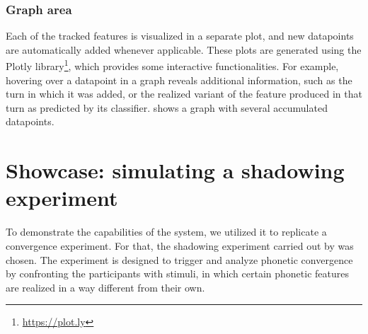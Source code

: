 \subsubsection{Graph area}
\label{subsubsec:graph_area}

Each of the tracked features is visualized in a separate plot, and new datapoints are automatically added whenever applicable.
These plots are generated using the Plotly library\footnote{\url{https://plot.ly}}, which provides some interactive functionalities.
For example, hovering over a datapoint in a graph reveals additional information, such as the turn in which it was added, or the realized variant of the feature produced in that turn as predicted by its classifier.
 shows a graph with several accumulated datapoints.

%

\section{Showcase: simulating a shadowing experiment}
\label{sec:showcase}

To demonstrate the capabilities of the system, we utilized it to replicate a convergence experiment.
For that, the shadowing experiment carried out by \citet{Gessinger2017Interspeech} was chosen.
The experiment is designed to trigger and analyze phonetic convergence by confronting the participants with stimuli, in which certain phonetic features are realized in a way different from their own.

